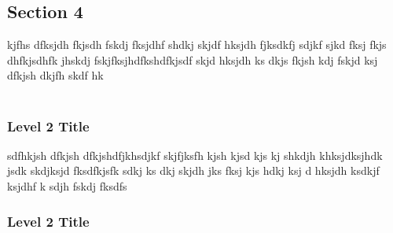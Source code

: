 \subsection{Section 4}

\begin{flushleft}
    kjfhs dfksjdh fkjsdh fskdj fksjdhf shdkj skjdf hksjdh fjksdkfj sdjkf sjkd fksj fkjs dhfkjsdhfk jhskdj fskjfksjhdfkshdfkjsdf skjd hksjdh ks dkjs fkjsh kdj fskjd ksj dfkjsh dkjfh skdf hk \\~\\
\end{flushleft}

\subsubsection{Level 2 Title}

\begin{flushleft}
    sdfhkjsh dfkjsh dfkjshdfjkhsdjkf skjfjksfh kjsh kjsd kjs kj shkdjh khksjdksjhdk jsdk skdjksjd fksdfkjsfk sdkj ks dkj skjdh jks fksj kjs hdkj ksj d hksjdh ksdkjf ksjdhf k sdjh fskdj fksdfs 
\end{flushleft}

\subsubsection{Level 2 Title}